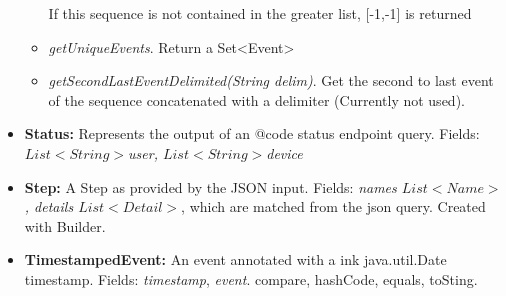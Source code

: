 \documentclass{article}
\begin{document}
\begin{itemize}
\begin{itemize}
		If this sequence is not contained in the greater list, [-1,-1] is returned
		\item\textit{getUniqueEvents}. Return a Set<Event>
		\item\textit{getSecondLastEventDelimited(String delim)}. Get the second to last event of the sequence concatenated with a delimiter (Currently not used).
	\end{itemize} 
	\item\textbf{Status: }Represents the output of an {@code status} endpoint query. Fields: \textit{$List<String>$user, $List<String>$device}
	\item\textbf{Step: } A Step as provided by the JSON input. Fields: \textit{names $List<Name>$, details $List<Detail>$}, which are matched from the json query. Created with Builder. 
	\item \textbf{TimestampedEvent: }An event annotated with a ink java.util.Date timestamp. Fields: \textit{timestamp}, \textit{event}. compare, hashCode, equals, toSting.
\end{itemize}
\end{document}
